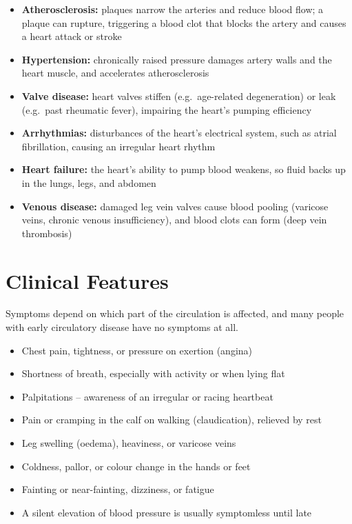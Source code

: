 \begin{itemize}
    \item \textbf{Atherosclerosis:} plaques narrow the arteries and reduce blood flow; a plaque can rupture, triggering a blood clot that blocks the artery and causes a heart attack or stroke
    \item \textbf{Hypertension:} chronically raised pressure damages artery walls and the heart muscle, and accelerates atherosclerosis
    \item \textbf{Valve disease:} heart valves stiffen (e.g.\ age-related degeneration) or leak (e.g.\ past rheumatic fever), impairing the heart's pumping efficiency
    \item \textbf{Arrhythmias:} disturbances of the heart's electrical system, such as atrial fibrillation, causing an irregular heart rhythm
    \item \textbf{Heart failure:} the heart's ability to pump blood weakens, so fluid backs up in the lungs, legs, and abdomen
    \item \textbf{Venous disease:} damaged leg vein valves cause blood pooling (varicose veins, chronic venous insufficiency), and blood clots can form (deep vein thrombosis)
\end{itemize}

\section*{Clinical Features}
Symptoms depend on which part of the circulation is affected, and many people with early circulatory disease have no symptoms at all.

\begin{itemize}
    \item Chest pain, tightness, or pressure on exertion (angina)
    \item Shortness of breath, especially with activity or when lying flat
    \item Palpitations -- awareness of an irregular or racing heartbeat
    \item Pain or cramping in the calf on walking (claudication), relieved by rest
    \item Leg swelling (oedema), heaviness, or varicose veins
    \item Coldness, pallor, or colour change in the hands or feet
    \item Fainting or near-fainting, dizziness, or fatigue
    \item A silent elevation of blood pressure is usually symptomless until late
\end{itemize}

